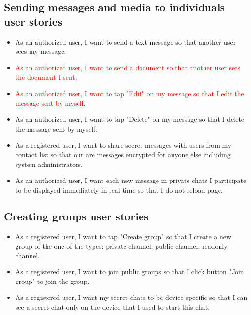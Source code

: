 \subsection{Sending messages and media to individuals user stories}
\label{subsec:sending-messages-and-media-feature-user-stories}
\begin{itemize}
    \item As an authorized user, I want to send a text message so that another user sees my message.
    \item \textcolor{red}{As an authorized user, I want to send a document so that another user sees the document I sent.}
    \item \textcolor{red}{As an authorized user, I want to tap "Edit" on my message so that I edit the message sent by myself.}
    \item As an authorized user, I want to tap "Delete" on my message so that I delete the message sent by myself.
    \item As a registered user, I want to share secret messages with users from my contact list so that our are
    messages encrypted for anyone else including system administrators.
    \item As an authorized user, I want each new message in private chats I participate to be displayed immediately
    in real-time so that I do not reload page.
\end{itemize}

\subsection{Creating groups user stories}\label{subsec:creating-groups-feature-user-stories}
\begin{itemize}
    \item As a registered user, I want to tap "Create group" so that I create a new group of the one of the types: private channel, public channel, readonly channel.
    \item As a registered user, I want to join public groups so that I click button "Join group" to join the group.
    \item As a registered user, I want my secret chats to be device-specific so that I can see a secret chat only on the device that I used to start this chat.
\end{itemize}

